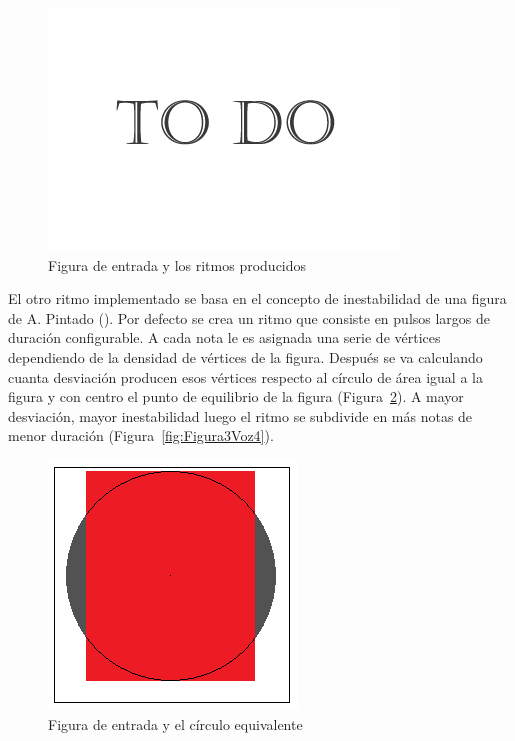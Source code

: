 		\begin{figure}[htbp]
		\centering
		\hspace*{0.0in}
		\includegraphics[scale=0.57]{graphics/todo.png}
		\caption{Figura de entrada y los ritmos producidos}
		\label{fig:Figur1Voz4}
		\end{figure}

El otro ritmo implementado se basa en el concepto de inestabilidad de una figura de A. Pintado (\cite{portutesis}). Por defecto se crea un ritmo que consiste en pulsos largos de duración configurable. A cada nota le es asignada una serie de vértices dependiendo de la densidad de vértices de la figura. Después se va calculando cuanta desviación producen esos vértices respecto al círculo de área igual a la figura y con centro el punto de equilibrio de la figura (Figura~\ref{fig:Figura2Voz4}). A mayor desviación, mayor inestabilidad luego el ritmo se subdivide en más notas de menor duración (Figura~\ref{fig:Figura3Voz4}).

		\begin{figure}[htbp]
		\centering
		\hspace*{0.0in}
		\includegraphics[scale=1]{graphics/simpletest2-Circulo.png}
		\caption{Figura de entrada y el círculo equivalente}
		\label{fig:Figura2Voz4}
		\end{figure}

